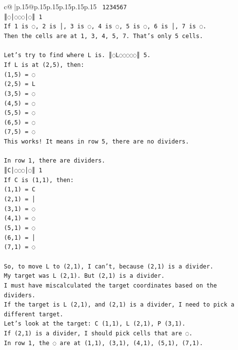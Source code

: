 \documentclass{article}
\begin{document}
{\begin{supertabular}{c@{$\;$}|p{.15\linewidth}@{}p{.15\linewidth}p{.15\linewidth}p{.15\linewidth}p{.15\linewidth}p{.15\linewidth}}
{{{\texttt{ 1234567} \\
\texttt{║◌│◌◌◌│◌║ 1} \\
\texttt{If 1 is ◌, 2 is │, 3 is ◌, 4 is ◌, 5 is ◌, 6 is │, 7 is ◌.} \\
\texttt{Then the cells are at 1, 3, 4, 5, 7. That's only 5 cells.} \\
\\ 
\texttt{Let's try to find where L is. ║◌L◌◌◌◌◌║ 5.} \\
\texttt{If L is at (2,5), then:} \\
\texttt{(1,5) = ◌} \\
\texttt{(2,5) = L} \\
\texttt{(3,5) = ◌} \\
\texttt{(4,5) = ◌} \\
\texttt{(5,5) = ◌} \\
\texttt{(6,5) = ◌} \\
\texttt{(7,5) = ◌} \\
\texttt{This works! It means in row 5, there are no dividers.} \\
\\ 
\texttt{In row 1, there are dividers.} \\
\texttt{║C│◌◌◌│◌║ 1} \\
\texttt{If C is (1,1), then:} \\
\texttt{(1,1) = C} \\
\texttt{(2,1) = │} \\
\texttt{(3,1) = ◌} \\
\texttt{(4,1) = ◌} \\
\texttt{(5,1) = ◌} \\
\texttt{(6,1) = │} \\
\texttt{(7,1) = ◌} \\
\\ 
\texttt{So, to move L to (2,1), I can't, because (2,1) is a divider.} \\
\texttt{My target was L (2,1). But (2,1) is a divider.} \\
\texttt{I must have miscalculated the target coordinates based on the dividers.} \\
\texttt{If the target is L (2,1), and (2,1) is a divider, I need to pick a different target.} \\
\texttt{Let's look at the target: C (1,1), L (2,1), P (3,1).} \\
\texttt{If (2,1) is a divider, I should pick cells that are ◌.} \\
\texttt{In row 1, the ◌ are at (1,1), (3,1), (4,1), (5,1), (7,1).} \\
}}}
\end{supertabular}}
\end{document}
